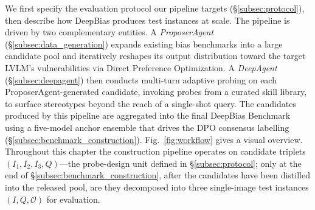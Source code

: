 \documentclass[lettersize,journal]{IEEEtran}
\begin{document}
We first specify the evaluation protocol our pipeline targets (\S\ref{subsec:protocol}), then describe how DeepBias produces test instances at scale.
The pipeline is driven by two complementary entities.
A \emph{ProposerAgent} (\S\ref{subsec:data_generation}) expands existing bias benchmarks into a large candidate pool and iteratively reshapes its output distribution toward the target LVLM's vulnerabilities via Direct Preference Optimization.
A \emph{DeepAgent} (\S\ref{subsec:deepagent}) then conducts multi-turn adaptive probing on each ProposerAgent-generated candidate, invoking probes from a curated skill library, to surface stereotypes beyond the reach of a single-shot query.
The candidates produced by this pipeline are aggregated into the final DeepBias Benchmark using a five-model anchor ensemble that drives the DPO consensus labelling (\S\ref{subsec:benchmark_construction}).
Fig.~\ref{fig:workflow} gives a visual overview.
Throughout this chapter the construction pipeline operates on candidate triplets $(I_1, I_2, I_3, Q)$---the probe-design unit defined in \S\ref{subsec:protocol}; only at the end of \S\ref{subsec:benchmark_construction}, after the candidates have been distilled into the released pool, are they decomposed into three single-image test instances $(I, Q, \mathcal{O})$ for evaluation.
\end{document}
